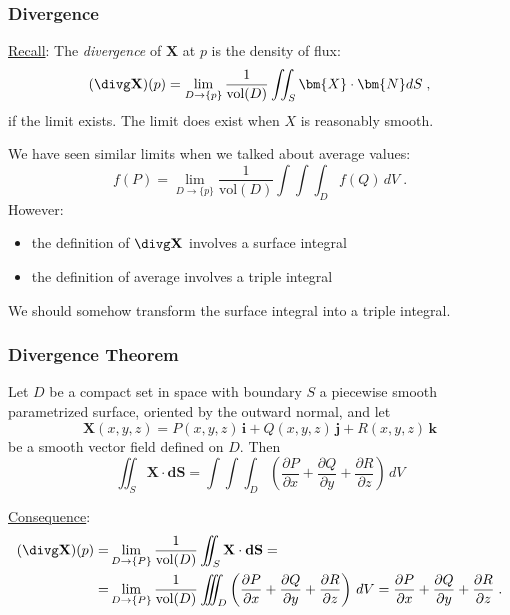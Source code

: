 \begin{frame}
  \frametitle{Divergence}

\underline{Recall}: The \emph{divergence} of $\textbf{X}$ at $p$ is the density of flux:
%
$$(\divg \textbf{X})(p) = \lim_{D\to \{p\}} \frac{1}{\text{vol}(D)} \iint_S \bm{X} \cdot \bm{N}dS \; ,$$
%
if the limit exists. \pause The limit does exist when $X$ is reasonably smooth.

\pause We have seen similar limits when we talked about average values:
%
$$f(P) = \lim_{D\to\{p\}} \frac{1}{\text{vol}(D)} \int\!\!\!\!\int\!\!\!\!\int_D f(Q)\, dV\; .$$
%
\pause However:
\begin{itemize}
  \item the definition of $\divg \textbf{X}$ involves a surface integral
  \item the definition of average involves a triple integral
\end{itemize}

\pause We should somehow transform the surface integral into a triple integral.
\end{frame}

\begin{frame}
  \frametitle{Divergence Theorem}

\begin{theorem}{\rm
  Let $D$ be a compact set in space with boundary $S$ a piecewise smooth parametrized surface, oriented by the outward normal, and let
%
$$\textbf{X}(x,y,z) = P(x,y,z) \, \textbf{i} + Q(x,y,z) \, \textbf{j} + R(x,y,z)\, \textbf{k}$$
%
be a smooth vector field defined on $D$. Then
%
$$\iint_S \bm{X} \cdot \bm{dS} = \int\!\!\!\!\!\int\!\!\!\!\!\int_D \left(\frac{\partial P}{\partial x}+ \frac{\partial Q}{\partial y} + \frac{\partial R}{\partial z} \right) \, dV$$
}\end{theorem}
%
\pause \underline{Consequence}:
%
\begin{align*}
  (\divg \textbf{X}) (p) = &
\lim_{D\to \{P\}} \frac{1}{\text{vol}(D)}\int\!\!\!\!\!\int_S \textbf{X} \cdot \textbf{dS}  = \\
= & \lim_{D\to \{P\}} \frac{1}{\text{vol}(D)}\int\!\!\!\!\!\int\!\!\!\!\!\int_D \left(\frac{\partial P}{\partial x}+ \frac{\partial Q}{\partial y} + \frac{\partial R}{\partial z} \right) \, dV =
  \frac{\partial P}{\partial x}+ \frac{\partial Q}{\partial y} + \frac{\partial R}{\partial z}\; .
\end{align*}


\end{frame}

